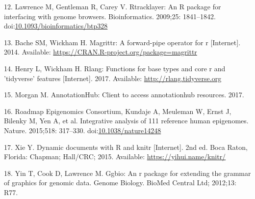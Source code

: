 \documentclass[10pt,letterpaper]{article}
\begin{document}
\leavevmode\hypertarget{ref-Lawrence2009-nt}{}%
12. Lawrence M, Gentleman R, Carey V. Rtracklayer: An R package for
interfacing with genome browsers. Bioinformatics. 2009;25: 1841--1842.
doi:\href{https://doi.org/10.1093/bioinformatics/btp328}{10.1093/bioinformatics/btp328}

\leavevmode\hypertarget{ref-R-magrittr}{}%
13. Bache SM, Wickham H. Magrittr: A forward-pipe operator for r
{[}Internet{]}. 2014. Available:
\url{https://CRAN.R-project.org/package=magrittr}

\leavevmode\hypertarget{ref-R-rlang}{}%
14. Henry L, Wickham H. Rlang: Functions for base types and core r and
'tidyverse' features {[}Internet{]}. 2017. Available:
\url{http://rlang.tidyverse.org}

\leavevmode\hypertarget{ref-R-ahub}{}%
15. Morgan M. AnnotationHub: Client to access annotationhub resources.
2017.

\leavevmode\hypertarget{ref-Roadmap_Epigenomics_Consortium2015-pr}{}%
16. Roadmap Epigenomics Consortium, Kundaje A, Meuleman W, Ernst J,
Bilenky M, Yen A, et al. Integrative analysis of 111 reference human
epigenomes. Nature. 2015;518: 317--330.
doi:\href{https://doi.org/10.1038/nature14248}{10.1038/nature14248}

\leavevmode\hypertarget{ref-R-knitr}{}%
17. Xie Y. Dynamic documents with R and knitr {[}Internet{]}. 2nd ed.
Boca Raton, Florida: Chapman; Hall/CRC; 2015. Available:
\url{https://yihui.name/knitr/}

\leavevmode\hypertarget{ref-R-ggbio}{}%
18. Yin T, Cook D, Lawrence M. Ggbio: An r package for extending the
grammar of graphics for genomic data. Genome Biology. BioMed Central
Ltd; 2012;13: R77.

\nolinenumbers
\end{document}
